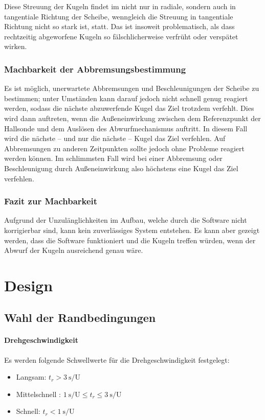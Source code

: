\documentclass{kis}
\newcommand{\todo}[1]{\errmessage{Unresolved TODO: #1}}
\begin{document}
Diese Streuung der Kugeln findet im nicht nur in radiale, sondern auch in tangentiale Richtung der Scheibe, wenngleich die Streuung in tangentiale Richtung nicht so stark ist, statt. Das ist insoweit problematisch, als dass rechtzeitig abgeworfene Kugeln so fälschlicherweise verfrüht oder verspätet wirken.


\subsubsection{Machbarkeit der Abbremsungsbestimmung}
Es ist möglich, unerwartete Abbremsungen und Beschleunigungen der Scheibe zu bestimmen; unter Umständen kann darauf jedoch nicht schnell genug reagiert werden, sodass die nächste abzuwerfende Kugel das Ziel trotzdem verfehlt. Dies wird dann auftreten, wenn die Außeneinwirkung zwischen dem Referenzpunkt der Hallsonde und dem Auslösen des Abwurfmechanismus auftritt. In diesem Fall wird die nächste -- und nur die nächste -- Kugel das Ziel verfehlen. Auf Abbremsungen zu anderen Zeitpunkten sollte jedoch ohne Probleme reagiert werden können. Im schlimmsten Fall wird bei einer Abbremsung oder Beschleunigung durch Außeneinwirkung also höchstens eine Kugel das Ziel verfehlen.

\subsubsection{Fazit zur Machbarkeit}
Aufgrund der Unzulänglichkeiten im Aufbau, welche durch die Software nicht korrigierbar sind, kann kein zuverlässiges System entstehen. Es kann aber gezeigt werden, dass die Software funktioniert und die Kugeln treffen würden, wenn der Abwurf der Kugeln ausreichend genau wäre.

\section{Design}
\subsection{Wahl der Randbedingungen}
\paragraph{Drehgeschwindigkeit}
Es werden folgende Schwellwerte für die Drehgeschwindigkeit festgelegt:
\begin{itemize}
	\item Langsam: $t_r>3~\text{s/U}$
	\item Mittelschnell : $1~\text{s/U}\leq t_r\leq 3~\text{s/U}$
	\item Schnell: $t_r<1~\text{s/U}$
\end{itemize}
\end{document}

